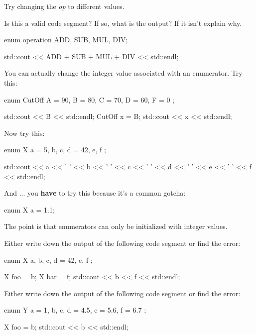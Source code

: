 Try changing the \textit{op} to different values.

\begin{ex}
Is this a valid code segment? If so, what is the
output? If it isn't explain why.

\begin{consolethree}[escapeinside=||]
enum operation {ADD, SUB, MUL, DIV};

std::cout << ADD + SUB + MUL + DIV << std::endl;
\end{consolethree}
\end{ex}


\newpage{}

You can actually change the integer value associated with an enumerator.
Try this:

\begin{consolethree}[escapeinside=||]
enum CutOff
{
    A = 90, B = 80, C = 70, D = 60, F = 0
};

std::cout << B << std::endl;
CutOff x = B;
std::cout << x << std::endl;
\end{consolethree}

Now try this:

\begin{consolethree}[escapeinside=||]
enum X
{
    a = 5, b, c, d = 42, e, f
};

std::cout << a << ' ' << b << ' ' << c << ' '
          << d << ' ' << e << ' ' << f << std::endl;
\end{consolethree}

And ... you \textbf{have} to try this because
it's a common gotcha:

\begin{consolethree}[escapeinside=||]
enum X {a = 1.1};
\end{consolethree}

The point is that enumerators can only be initialized with integer
values.

\begin{ex}
Either write down the output of the following code segment or
find the error:

\begin{consolethree}[escapeinside=||]
enum X
{
    a, b, c, d = 42, e, f
};

X foo = b;
X bar = f;
std::cout << b << f << std::endl;
\end{consolethree}
\end{ex}

\begin{ex}
Either write down the output of the following code segment or
find the error:

\begin{consolethree}[escapeinside=||]
enum Y
{
    a = 1, b, c, d = 4.5, e = 5.6, f = 6.7
};

X foo = b;
std::cout << b << std::endl;
\end{consolethree}
\end{ex}


